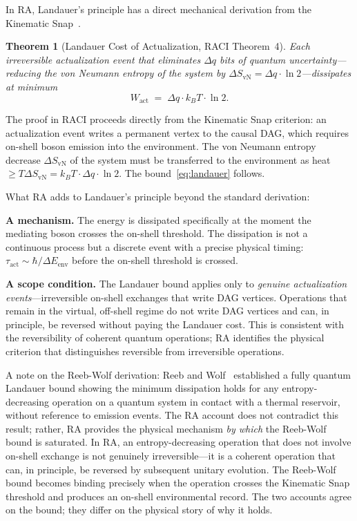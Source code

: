 \documentclass[11pt,a4paper]{article}
\theoremstyle{plain}
\newtheorem{theorem}{Theorem}[section]
\theoremstyle{definition}
\theoremstyle{remark}
\begin{document}
In RA, Landauer's principle has a direct mechanical derivation from the Kinematic
Snap~\citep{Sandeman2026RACI}.

\begin{theorem}[Landauer Cost of Actualization, RACI Theorem~4]
Each irreversible actualization event that eliminates $\Delta q$ bits of quantum
uncertainty---reducing the von Neumann entropy of the system by
$\Delta S_{\mathrm{vN}} = \Delta q \cdot \ln 2$---dissipates at minimum
\begin{equation}
  W_{\mathrm{act}} \;=\; \Delta q \cdot k_B T \cdot \ln 2.
  \label{eq:landauer}
\end{equation}
\end{theorem}

The proof in RACI proceeds directly from the Kinematic Snap criterion: an
actualization event writes a permanent vertex to the causal DAG, which requires
on-shell boson emission into the environment. The von Neumann entropy decrease
$\Delta S_{\mathrm{vN}}$ of the system must be transferred to the environment as
heat $\geq T \Delta S_{\mathrm{vN}} = k_B T \cdot \Delta q \cdot \ln 2$. The
bound~\eqref{eq:landauer} follows.

What RA adds to Landauer's principle beyond the standard derivation:

\textbf{A mechanism.} The energy is dissipated specifically at the moment the
mediating boson crosses the on-shell threshold. The dissipation is not a
continuous process but a discrete event with a precise physical timing:
$\tau_{\mathrm{act}} \sim \hbar / \Delta E_{\mathrm{env}}$ before the on-shell
threshold is crossed.

\textbf{A scope condition.} The Landauer bound applies only to \emph{genuine
actualization events}---irreversible on-shell exchanges that write DAG vertices.
Operations that remain in the virtual, off-shell regime do not write DAG vertices
and can, in principle, be reversed without paying the Landauer cost. This is
consistent with the reversibility of coherent quantum operations; RA identifies the
physical criterion that distinguishes reversible from irreversible operations.

A note on the Reeb-Wolf derivation: Reeb and Wolf~\citep{ReebWolf2014} established
a fully quantum Landauer bound showing the minimum dissipation holds for any
entropy-decreasing operation on a quantum system in contact with a thermal
reservoir, without reference to emission events. The RA account does not contradict
this result; rather, RA provides the physical mechanism \emph{by which} the Reeb-Wolf
bound is saturated. In RA, an entropy-decreasing operation that does not involve
on-shell exchange is not genuinely irreversible---it is a coherent operation that
can, in principle, be reversed by subsequent unitary evolution. The Reeb-Wolf bound
becomes binding precisely when the operation crosses the Kinematic Snap threshold
and produces an on-shell environmental record. The two accounts agree on the bound;
they differ on the physical story of why it holds.
\end{document}
